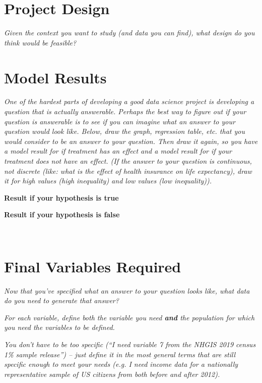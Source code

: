 \documentclass[12pt]{article}
\begin{document}
\section{Project Design}
\emph{Given the context you want to study (and data you can find), what design do you think would be feasible?}
\vspace*{1cm}\\


\section{Model Results}
\emph{One of the hardest parts of developing a good data science project is developing a question that is actually answerable. Perhaps the best way to figure out if your question is answerable is to see if you can imagine what an answer to your question would look like. Below, draw the graph, regression table, etc. that you would consider to be an answer to your question. Then draw it again, so you have a model result for if treatment has an effect and a model result for if your treatment does not have an effect. (If the answer to your question is continuous, not discrete (like: what is the effect of health insurance on life expectancy), draw it for high values (high inequality) and low values (low inequality)).}

\begin{minipage}{0.5\textwidth}
\centering
\textbf{Result if your hypothesis is true}
\end{minipage}
\begin{minipage}{0.5\textwidth}
\centering
\textbf{Result if your hypothesis is false}
\end{minipage}
\vspace*{5cm}\\

\section{Final Variables Required}

\emph{Now that you've specified what an answer to your question looks like, what data do you need to generate that answer?}

\emph{For each variable, define both the variable you need \textbf{and} the population for which you need the variables to be defined.}

\emph{You don't have to be too specific (``I need variable 7 from the NHGIS 2019 census 1\% sample release'') -- just define it in the most general terms that are still specific enough to meet your needs (e.g. I need income data for a nationally representative sample of US citizens from both before and after 2012). }
\end{document}
